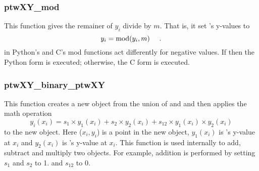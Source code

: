\subsubsection{ptwXY\_mod}
This function gives the remainer of $y_i$ divide by $m$. That is, it set 's y-values to 
\begin{equation}
    y_i = {\rm mod}( y_i, m ) \ \ \ \ .
\end{equation}
     in \noindent
Python's and C's mod functions act differently for negative values. If  then the Python form is executed;
otherwise, the C form is executed.

\subsubsection{ptwXY\_binary\_ptwXY}
This function creates a new  object from the union of  and  and then
applies the math operation
\begin{equation}
    y_i(x_i) = s_1 \times y_1(x_i) + s_2 \times y_2(x_i) + s_{12} \times y_1(x_i) \times y_2(x_i)
\end{equation}
to the new object. Here ($x_i,y_i$) is a point in the new object, $y_1(x_i)$ is 's y-value at $x_i$ and 
$y_2(x_i)$ is 's y-value at $x_i$.
This function is used internally to add, subtract and multiply two  objects. For example, addition is performed
by setting $s_1$ and $s_2$ to 1. and $s_{12}$ to 0.

